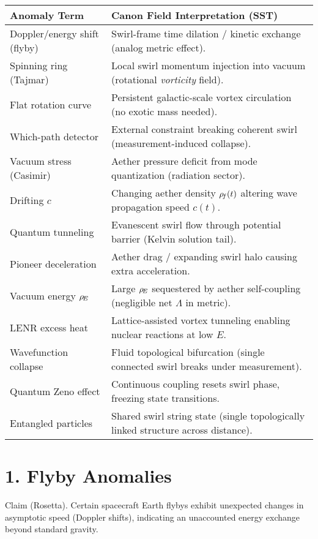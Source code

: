 \documentclass[11pt]{article}
\begin{document}
\begin{tabular}{p{4.5cm} p{11cm}}
\textbf{Anomaly Term} & \textbf{Canon Field Interpretation (SST)} \\ \hline
Doppler/energy shift (flyby) & Swirl-frame time dilation / kinetic exchange (analog metric effect). \\
Spinning ring (Tajmar) & Local swirl momentum injection into vacuum (rotational \textit{vorticity} field). \\
Flat rotation curve & Persistent galactic-scale vortex circulation (no exotic mass needed). \\
Which-path detector & External constraint breaking coherent swirl (measurement-induced collapse). \\
Vacuum stress (Casimir) & Aether pressure deficit from mode quantization (radiation sector). \\
Drifting $c$ & Changing aether density $\rho_{\!f}(t)$ altering wave propagation speed $c(t)$. \\
Quantum tunneling & Evanescent swirl flow through potential barrier (Kelvin solution tail). \\
Pioneer deceleration & Aether drag / expanding swirl halo causing extra acceleration. \\
Vacuum energy $\rho_{\!E}$ & Large $\rho_{\!E}$ sequestered by aether self-coupling (negligible net $\Lambda$ in metric). \\
LENR excess heat & Lattice-assisted vortex tunneling enabling nuclear reactions at low $E$. \\
Wavefunction collapse & Fluid topological bifurcation (single connected swirl breaks under measurement). \\
Quantum Zeno effect & Continuous coupling resets swirl phase, freezing state transitions. \\
Entangled particles & Shared swirl string state (single topologically linked structure across distance). \\
\end{tabular}



\section*{1. Flyby Anomalies}

Claim (Rosetta). Certain spacecraft Earth flybys exhibit unexpected changes in asymptotic speed (Doppler shifts), indicating an unaccounted energy exchange beyond standard gravity.
\end{document}
